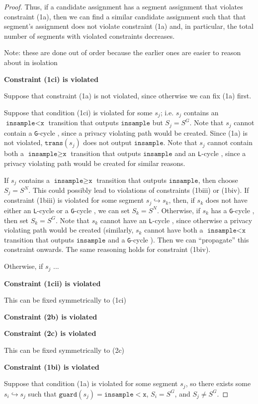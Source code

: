 \documentclass[12pt]{article}
\newcommand{\gguard}[1][x]{\texttt{insample}\geq \texttt{#1}}
\newcommand{\lguard}[1][x]{\texttt{insample} < \texttt{#1}}
\newcommand{\guard}{\texttt{guard}}
\newcommand{\trans}{\texttt{trans}}
\newcommand{\gcycle}{\texttt{G}-cycle }
\newcommand{\lcycle}{\texttt{L}-cycle }
\theoremstyle{definition}
\begin{document}
\begin{proof}
	Thus, if a candidate assignment has a segment assignment that violates constraint (1a), then we can find a similar candidate assignment such that that segment's assignment does not violate constraint (1a) and, in particular, the total number of segments with violated constraints decreases. 


	{\color{red} Note: these are done out of order because the earlier ones are easier to reason about in isolation}

	\textbf{Constraint (1ci) is violated}

	Suppose that constraint (1a) is not violated, since otherwise we can fix (1a) first. 

	Suppose that condition (1ci) is violated for some $s_j$; i.e. $s_j$ contains an $\lguard$ transition that outputs $\texttt{insample}$ but $S_j = S^G$. Note that $s_j$ cannot contain a \gcycle, since a privacy violating path would be created. Since (1a) is not violated, $\trans(s_j)$ does not output $\texttt{insample}$. 
	Note that $s_j$ cannot contain both a $\gguard$ transition that outputs $\texttt{insample}$ and an \lcycle, since a privacy violating path would be created for similar reasons.
	
	If $s_j$ contains a $\gguard$ transition that outputs $\texttt{insample}$, then choose $S_j = S^N$. This could possibly lead to violations of constraints (1biii) or (1biv). If constraint (1biii) is violated for some segment $s_j \hookrightarrow s_k$, then, if $s_k$ does not have either an \lcycle or a \gcycle, we can set $S_k = S^N$. 
	Otherwise, if $s_k$ has a \gcycle, then set $S_k = S^G$. 
	Note that $s_k$ cannot have an \lcycle, since otherwise a privacy violating path would be created (similarly, $s_k$ cannot have both a $\lguard$ transition that outputs $\texttt{insample}$ and a \gcycle). Then we can ``propagate'' this constraint onwards. The same reasoning holds for constraint (1biv). 

	Otherwise, if $s_j$ ...


	\textbf{Constraint (1cii) is violated}

	This can be fixed symmetrically to (1ci)

	\textbf{Constraint (2b) is violated}

	\textbf{Constraint (2c) is violated}
	
	This can be fixed symmetrically to (2c)

	\textbf{Constraint (1bi) is violated}
	
	Suppose that condition (1a) is violated for some segment $s_j$, so there exists some $s_i\hookrightarrow s_j$ such that $\guard(s_j) = \lguard$, $S_i = S^G$, and $S_j \neq S^G$. 
	 

\end{proof}
\end{document}
